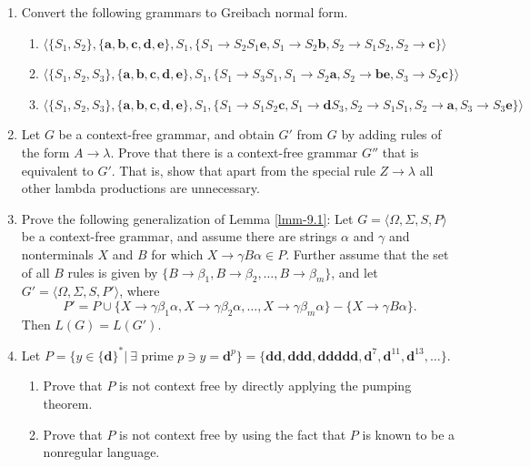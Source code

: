 \begin{enumerate}[{9.}1.]
\item Convert the following grammars to Greibach normal form.
\begin{enumerate}
\item $\langle\{S_1,S_2\},\{\pmb{a},\pmb{b},\pmb{c},\pmb{d},\pmb{e}\},S_1,\{S_1
\rightarrow S_2S_1\pmb{e},S_1\rightarrow S_2\pmb{b},S_2\rightarrow S_1S_2,S_2
\rightarrow\pmb{c}\}\rangle$
\item $\langle\{S_1,S_2,S_3\},\{\pmb{a},\pmb{b},\pmb{c},\pmb{d},\pmb{e}\},S_1,
\{S_1\rightarrow S_3S_1, S_1\rightarrow S_2\pmb{a},S_2\rightarrow\pmb{be},S_3
\rightarrow S_2\pmb{c}\}\rangle$
\item $\langle\{S_1,S_2,S_3\},\{\pmb{a},\pmb{b},\pmb{c},\pmb{d},\pmb{e}\},S_1,
\{S_1\rightarrow S_1S_2\pmb{c},S_1\rightarrow\pmb{d}S_3,S_2\rightarrow S_1S_1,
S_2\rightarrow\pmb{a},S_3\rightarrow S_3\pmb{e}\}\rangle$
\end{enumerate}

\item Let $G$ be a context-free grammar, and obtain $G'$ from $G$ by adding
rules of the form $A\rightarrow\lambda$. Prove that there is a context-free
grammar $G''$ that is equivalent to $G'$. That is, show that apart from the
special rule $Z\rightarrow\lambda$ all other lambda productions are unnecessary.

\item Prove the following generalization of Lemma \ref{lmm-9.1}: Let $G=\langle\Omega,
\Sigma,S,P\rangle$ be a context-free grammar, and assume there are strings
$\alpha$ and $\gamma$ and nonterminals $X$ and $B$ for which $X\rightarrow\gamma
B\alpha\in P$. Further assume that the set of all $B$ rules is given by
$\{B\rightarrow\beta_1,B\rightarrow\beta_2,\ldots,B\rightarrow\beta_m\}$, and
let $G' = \langle\Omega,\Sigma,S,P'\rangle$, where
\[ P' = P\cup\{X\rightarrow\gamma\beta_1\alpha,X\rightarrow\gamma\beta_2
	\alpha,\ldots,X\rightarrow\gamma\beta_m\alpha\}-\{X\rightarrow\gamma
	B\alpha\}. \]
Then $L(G) = L(G')$.

\item Let $P=\{y\in\{\pmb{d}\}^*|\ \exists$ prime $p \ni y = \pmb{d}^p\}=\{\pmb{dd},
\pmb{ddd},\pmb{ddddd},\pmb{d}^7,\pmb{d}^{11},\pmb{d}^{13},\ldots\}$.
\begin{enumerate}
\item Prove that $P$ is not context free by directly applying the pumping
theorem.
\item Prove that $P$ is not context free by using the fact that $P$ is known to
be a nonregular language.
\end{enumerate}


\end{enumerate}
